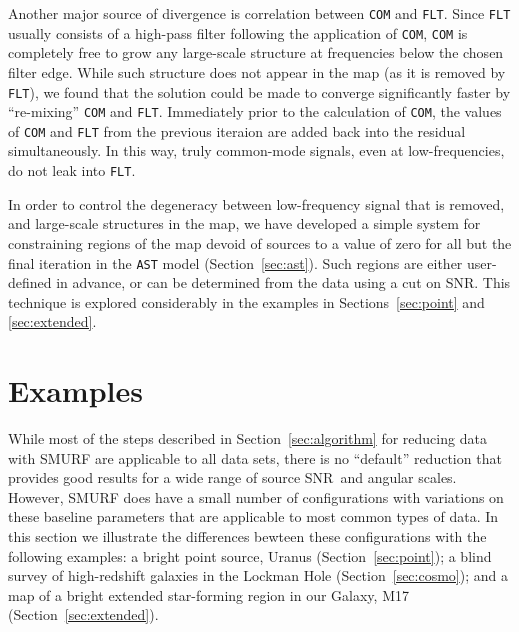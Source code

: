 \documentclass[useAMS,usenatbib,nofootinbib]{mn2e}
\newcommand{\snr}{SNR}
\newcommand{\model}[1]{\texttt{#1}}
\begin{document}
Another major source of divergence is correlation between \model{COM}
and \model{FLT}. Since \model{FLT} usually consists of a high-pass
filter following the application of \model{COM}, \model{COM} is
completely free to grow any large-scale structure at frequencies below
the chosen filter edge. While such structure does not appear in the
map (as it is removed by \model{FLT}), we found that the solution
could be made to converge significantly faster by ``re-mixing''
\model{COM} and \model{FLT}. Immediately prior to the calculation of
\model{COM}, the values of \model{COM} and \model{FLT} from the
previous iteraion are added back into the residual simultaneously. In
this way, truly common-mode signals, even at low-frequencies, do not
leak into \model{FLT}.

In order to control the degeneracy between low-frequency signal that
is removed, and large-scale structures in the map, we have developed a
simple system for constraining regions of the map devoid of sources to
a value of zero for all but the final iteration in the \model{AST}
model (Section~\ref{sec:ast}). Such regions are either user-defined in
advance, or can be determined from the data using a cut on \snr. This
technique is explored considerably in the examples in
Sections~\ref{sec:point} and \ref{sec:extended}.

\section{Examples}
\label{sec:examples}

While most of the steps described in Section~\ref{sec:algorithm} for
reducing data with SMURF are applicable to all data sets, there is no
``default'' reduction that provides good results for a wide range of
source \snr\ and angular scales. However, SMURF does have a small
number of configurations with variations on these baseline parameters
that are applicable to most common types of data. In this section we
illustrate the differences bewteen these configurations with the
following examples: a bright point source, Uranus
(Section~\ref{sec:point}); a blind survey of high-redshift galaxies in
the Lockman Hole (Section~\ref{sec:cosmo}); and a map of a bright
extended star-forming region in our Galaxy, M17
(Section~\ref{sec:extended}).

\end{document}
